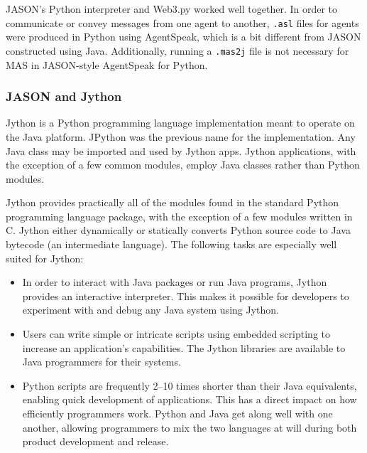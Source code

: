 \vspace{.5cm}

JASON's Python interpreter and Web3.py worked well together. In order to communicate or convey messages from one agent to another, \texttt{.asl} files for agents were produced in Python using AgentSpeak, which is a bit different from JASON constructed using Java. Additionally, running a \texttt{.mas2j} file is not necessary for \ac{MAS} in JASON-style AgentSpeak for Python.

\subsubsection{JASON and Jython}


Jython is a Python programming language implementation meant to operate on the Java platform. JPython was the previous name for the implementation. Any Java class may be imported and used by Jython apps. Jython applications, with the exception of a few common modules, employ Java classes rather than Python modules. 

\vspace{.5cm}
Jython provides practically all of the modules found in the standard Python programming language package, with the exception of a few modules written in C. Jython either dynamically or statically converts Python source code to Java bytecode (an intermediate language). The following tasks are especially well suited for Jython:

\begin{itemize}
    \item In order to interact with Java packages or run Java programs, Jython provides an interactive interpreter. This makes it possible for developers to experiment with and debug any Java system using Jython.
    \vspace{.5cm}
    \item Users can write simple or intricate scripts using embedded scripting to increase an application's capabilities. The Jython libraries are available to Java programmers for their systems.
    \vspace{.5cm}
     \item Python scripts are frequently 2–10 times shorter than their Java equivalents, enabling quick development of applications. This has a direct impact on how efficiently programmers work. Python and Java get along well with one another, allowing programmers to mix the two languages at will during both product development and release.
\end{itemize}


